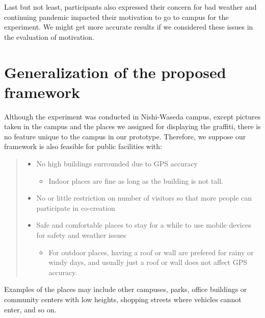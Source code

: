 Last but not least, participants also expressed their concern for bad weather and continuing pandemic impacted their motivation to go to campus for the experiment.
We might get more accurate results if we considered these issues in the evaluation of motivation.

\section{Generalization of the proposed framework}

Although the experiment was conducted in Nishi-Waseda campus, except pictures taken in the campus and the places we assigned for displaying the graffiti,
there is no feature unique to the campus in our prototype.
Therefore, we suppose our framework is also feasible for public facilities with:
\begin{quote}
  \begin{itemize}
    \item No high buildings surrounded due to GPS accuracy
      \begin{itemize}
        \item Indoor places are fine as long as the building is not tall.
      \end{itemize}
    \item No or little restriction on number of visitors so that more people can participate in co-creation
    \item Safe and comfortable places to stay for a while to use mobile devices for safety and weather issues
      \begin{itemize}
        \item For outdoor places, having a roof or wall are prefered for rainy or windy days, and usually just a roof or wall does not affect GPS accuracy.
      \end{itemize}
  \end{itemize}
\end{quote}

Examples of the places may include other campuses, parks, office buildings or community centers with low heights, shopping streets where vehicles cannot enter, and so on.